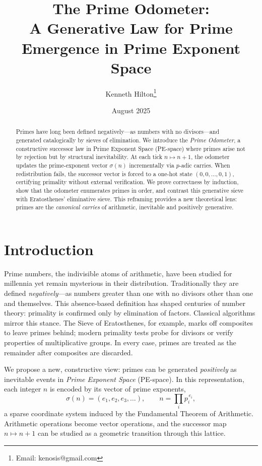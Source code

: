 \documentclass[12pt]{article}
\title{The Prime Odometer:\\A Generative Law for Prime Emergence in Prime Exponent Space}
\author{Kenneth Hilton\thanks{Email: kenosis@gmail.com}}
\date{August 2025}
\theoremstyle{definition}
\theoremstyle{remark}
\begin{document}
\maketitle
\begin{abstract}
Primes have long been defined negatively---as numbers with no divisors---and generated catalogically by sieves of elimination. We introduce the \textit{Prime Odometer}, a constructive successor law in Prime Exponent Space (PE-space) where primes arise not by rejection but by structural inevitability. At each tick $n \mapsto n+1$, the odometer updates the prime-exponent vector $\sigma(n)$ incrementally via $p$-adic carries. When redistribution fails, the successor vector is forced to a one-hot state $(0,0,\dots,0,1)$, certifying primality without external verification. We prove correctness by induction, show that the odometer enumerates primes in order, and contrast this generative sieve with Eratosthenes’ eliminative sieve. This reframing provides a new theoretical lens: primes are the \textit{canonical carries} of arithmetic, inevitable and positively generative.
\end{abstract}


\section{Introduction}

Prime numbers, the indivisible atoms of arithmetic, have been studied for millennia yet remain
mysterious in their distribution. Traditionally they are defined \emph{negatively}---as numbers greater
than one with no divisors other than one and themselves. This absence-based definition has shaped
centuries of number theory: primality is confirmed only by elimination of factors. Classical
algorithms mirror this stance. The Sieve of Eratosthenes, for example, marks off composites to leave
primes behind; modern primality tests probe for divisors or verify properties of multiplicative
groups. In every case, primes are treated as the remainder after composites are discarded.

We propose a new, constructive view: primes can be generated \emph{positively} as inevitable events in
\textit{Prime Exponent Space} (PE-space). In this representation, each integer $n$ is encoded by its
vector of prime exponents,
\[
\sigma(n) = (e_1, e_2, e_3, \dots), \qquad n = \prod_i p_i^{\,e_i},
\]
a sparse coordinate system induced by the Fundamental Theorem of Arithmetic. Arithmetic operations
become vector operations, and the successor map $n \mapsto n+1$ can be studied as a geometric
transition through this lattice.
\end{document}

